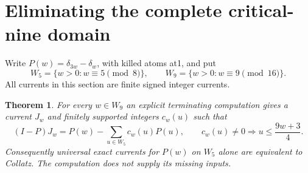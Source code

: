 \documentclass[11pt]{article}
\newtheorem{theorem}{Theorem}
\begin{document}
\section{Eliminating the complete critical-nine domain}
Write $P(w)=\delta_{3w}-\delta_w$, with killed atoms at1, and put
\[
 W_5=\{w>0:w\equiv5\pmod8\},\qquad
 W_9=\{w>0:w\equiv9\pmod{16}\}.
\]
All currents in this section are finite signed integer currents.
\begin{theorem}\label{thm:criticalnine}
For every $w\in W_9$ an explicit terminating computation gives a current
$J_w$ and finitely supported integers $c_w(u)$ such that
\[
 (I-P)J_w=P(w)-\sum_{u\in W_5}c_w(u)P(u),\qquad
 c_w(u)\ne0\Longrightarrow u\le\frac{9w+3}{4}.
\]
Consequently universal exact currents for $P(w)$ on $W_5$ alone are
equivalent to Collatz. The computation does not supply its missing inputs.
\end{theorem}
\end{document}
